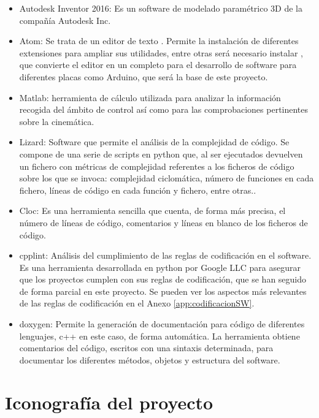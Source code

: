 \begin{itemize}
    \item Autodesk Inventor 2016: Es un software de modelado paramétrico 3D de la compañía Autodesk Inc.
    \item Atom: Se trata de un editor de texto . Permite la instalación de diferentes extensiones para ampliar sus utilidades, entre otras será necesario instalar , que convierte el editor en un  completo para el desarrollo de software para diferentes placas como Arduino, que será la base de este proyecto.
    \item Matlab: herramienta de cálculo utilizada para analizar la información recogida del ámbito de control así como para las comprobaciones pertinentes sobre la cinemática.
    \item Lizard: Software que permite el análisis de la complejidad de código. Se compone de una serie de scripts en python que, al ser ejecutados devuelven un fichero con métricas de complejidad referentes a los ficheros de código sobre los que se invoca: complejidad ciclomática, número de funciones en cada fichero, líneas de código en cada función y fichero, entre otras..
    \item Cloc: Es una herramienta sencilla que cuenta, de forma más precisa, el número de líneas de código, comentarios y líneas en blanco de los ficheros de código.
    \item cpplint: Análisis del cumplimiento de las reglas de codificación en el software. Es una herramienta desarrollada en python por Google LLC para asegurar que los proyectos cumplen con sus reglas de codificación, que se han seguido de forma parcial en este proyecto. Se pueden ver los aspectos más relevantes de las reglas de codificación en el Anexo \ref{app:codificacionSW}.
    \item doxygen: Permite la generación de documentación para código de diferentes lenguajes, c++ en este caso, de forma automática. La herramienta obtiene comentarios del código, escritos con una sintaxis determinada, para documentar los diferentes métodos, objetos y estructura del software.
\end{itemize}


\section{Iconografía del proyecto}

